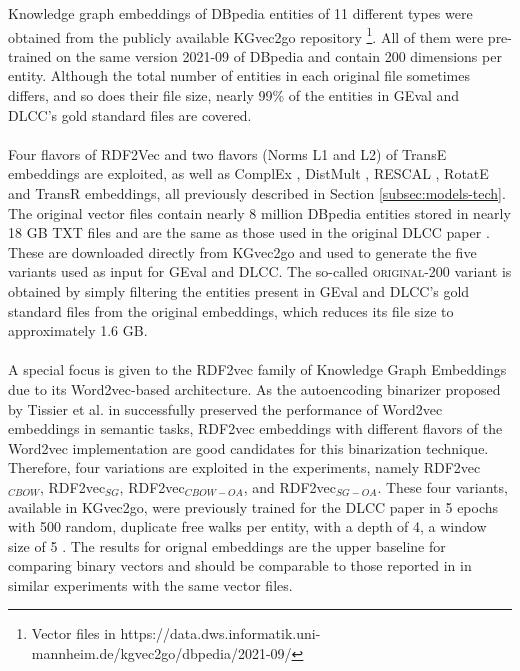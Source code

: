 \documentclass[11pt,titlepage,oneside,openany]{book}
\begin{document}
Knowledge graph embeddings of DBpedia entities of 11 different types were obtained from the publicly available KGvec2go repository \cite{portisch_kgvec2go_2020}\footnote{Vector files in https://data.dws.informatik.uni-mannheim.de/kgvec2go/dbpedia/2021-09/}. All of them were pre-trained on the same version 2021-09 of DBpedia and contain 200 dimensions per entity. Although the total number of entities in each original file sometimes differs, and so does their file size, nearly 99\% of the entities in GEval and DLCC's gold standard files are covered.\\
\\
Four flavors of RDF2Vec \cite{ristoski_rdf2vec_2019} and two flavors (Norms L1 and L2) of TransE \cite{bordes_translating_2013} embeddings are exploited, as well as ComplEx \cite{trouillon_complex_2016}, DistMult \cite{yang_embedding_2014}, RESCAL \cite{nickel_three-way_2011}, RotatE \cite{sun_rotate_2019} and TransR \cite{lin_learning_2015} embeddings, all previously described in Section \ref{subsec:models-tech}. The original vector files contain nearly 8 million DBpedia entities stored in nearly 18 GB TXT files and are the same as those used in the original DLCC paper \cite{portisch_dlcc_2022}. These are downloaded directly from KGvec2go and used to generate the five variants used as input for GEval and DLCC. The so-called \textsc{original-200} variant is obtained by simply filtering the entities present in GEval and DLCC's gold standard files from the original embeddings, which reduces its file size to approximately 1.6 GB.\\
\\
A special focus is given to the RDF2vec family of Knowledge Graph Embeddings due to its Word2vec-based architecture. As the autoencoding binarizer proposed by Tissier et al. in \cite{tissier_near-lossless_2019} successfully preserved the performance of Word2vec embeddings in semantic tasks, RDF2vec embeddings with different flavors of the Word2vec implementation are good candidates for this binarization technique. Therefore, four variations are exploited in the experiments, namely RDF2vec$_{CBOW}$, RDF2vec$_{SG}$, RDF2vec$_{CBOW-OA}$, and RDF2vec$_{SG-OA}$. These four variants, available in KGvec2go, were previously trained for the DLCC paper in 5 epochs with 500 random, duplicate free walks per entity, with a depth of 4, a window size of 5 \cite{portisch_dlcc_2022}. The results for orignal embeddings are the upper baseline for comparing binary vectors and should be comparable to those reported in \cite{portisch_rdf2vec_2023} in similar experiments with the same vector files.
\end{document}
